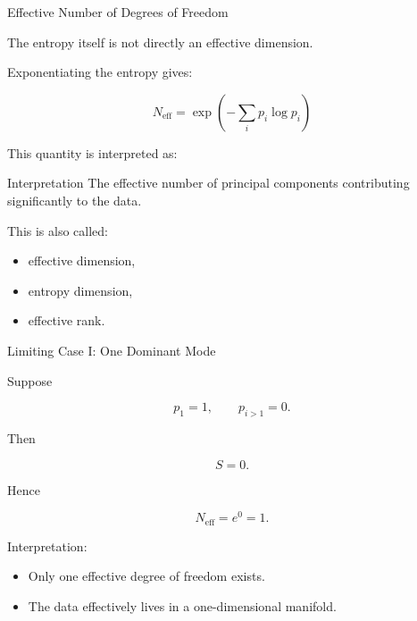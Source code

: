 \documentclass{beamer}
\begin{document}
\begin{frame}{Effective Number of Degrees of Freedom}

The entropy itself is not directly an effective dimension.

\vspace{0.4cm}

Exponentiating the entropy gives:

\[
N_{\mathrm{eff}} = \exp\left(-\sum_i p_i \log p_i\right)
\]

\vspace{0.5cm}

This quantity is interpreted as:

\begin{block}{Interpretation}
The effective number of principal components contributing significantly to the data.
\end{block}

\vspace{0.4cm}

This is also called:

\begin{itemize}
    \item effective dimension,
    \item entropy dimension,
    \item effective rank.
\end{itemize}

\end{frame}

\begin{frame}{Limiting Case I: One Dominant Mode}

Suppose

\[
p_1=1,
\qquad
p_{i>1}=0.
\]

\vspace{0.4cm}

Then

\[
S=0.
\]

Hence

\[
N_{\mathrm{eff}}=e^0=1.
\]

\vspace{0.5cm}

Interpretation:

\begin{itemize}
    \item Only one effective degree of freedom exists.
    \item The data effectively lives in a one-dimensional manifold.
\end{itemize}

\end{frame}
\end{document}

